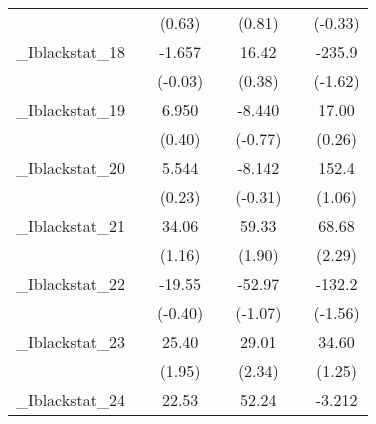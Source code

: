 {\begin{tabular}{l*{6}{c}}
            &                     &      (0.63)         &                     &      (0.81)         &                     &     (-0.33)         \\
[1em]
\_Iblackstat\_18&                     &      -1.657         &                     &       16.42         &                     &      -235.9         \\
            &                     &     (-0.03)         &                     &      (0.38)         &                     &     (-1.62)         \\
[1em]
\_Iblackstat\_19&                     &       6.950         &                     &      -8.440         &                     &       17.00         \\
            &                     &      (0.40)         &                     &     (-0.77)         &                     &      (0.26)         \\
[1em]
\_Iblackstat\_20&                     &       5.544         &                     &      -8.142         &                     &       152.4         \\
            &                     &      (0.23)         &                     &     (-0.31)         &                     &      (1.06)         \\
[1em]
\_Iblackstat\_21&                     &       34.06         &                     &       59.33         &                     &       68.68\sym{*}  \\
            &                     &      (1.16)         &                     &      (1.90)         &                     &      (2.29)         \\
[1em]
\_Iblackstat\_22&                     &      -19.55         &                     &      -52.97         &                     &      -132.2         \\
            &                     &     (-0.40)         &                     &     (-1.07)         &                     &     (-1.56)         \\
[1em]
\_Iblackstat\_23&                     &       25.40         &                     &       29.01\sym{*}  &                     &       34.60         \\
            &                     &      (1.95)         &                     &      (2.34)         &                     &      (1.25)         \\
[1em]
\_Iblackstat\_24&                     &       22.53         &                     &       52.24         &                     &      -3.212         \\

\end{tabular}}
